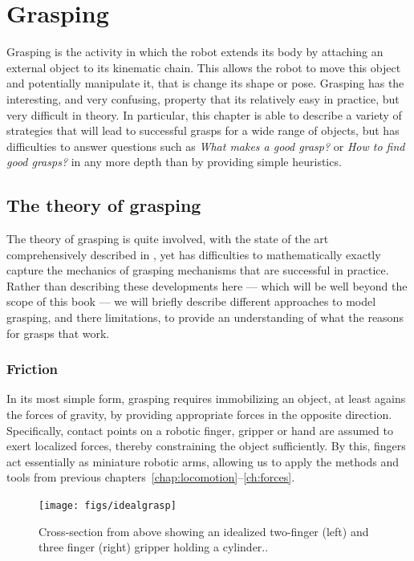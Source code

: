 \chapter{Grasping}
Grasping is the activity in which the robot extends its body by attaching an external object to its kinematic chain. This allows the robot to move this object and potentially manipulate it, that is change its shape or pose. Grasping has the interesting, and very confusing, property that its relatively easy in practice, but very difficult in theory. In particular, this chapter is able to describe a variety of strategies that will lead to successful grasps for a wide range of objects, but has difficulties to answer questions such as \emph{What makes a good grasp?} or \emph{How to find good grasps?} in any more depth than by providing simple heuristics.

\section{The theory of grasping}
The theory of grasping is quite involved, with the state of the art comprehensively described in \cite{rimon2019mechanics}, yet has difficulties to mathematically exactly capture the mechanics of grasping mechanisms that are successful in practice. Rather than describing these developments here --- which will be well beyond the scope of this book --- we will briefly describe different approaches to model grasping, and there limitations, to provide an understanding of what the reasons for grasps that work.

\subsection{Friction}\label{sec:grasping_friction}
In its most simple form, grasping requires immobilizing an object, at least agains the forces of gravity, by providing appropriate forces in the opposite direction. Specifically, contact points on a robotic finger, gripper or hand are assumed to exert localized forces, thereby constraining the object sufficiently. By this, fingers act essentially as miniature robotic arms, allowing us to apply the methods and tools from previous chapters~\ref{chap:locomotion}--\ref{ch:forces}.


\begin{figure}
\texttt{[image: figs/idealgrasp]}
\caption{Cross-section from above showing an idealized two-finger (left) and three finger (right) gripper holding a cylinder.\label{fig:idealgrasp}.}
\end{figure}

